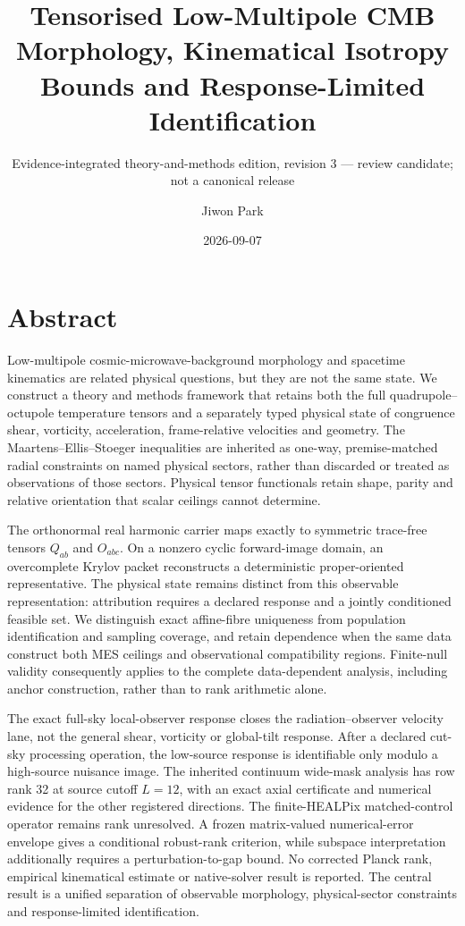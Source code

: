 \documentclass[
  11pt,
  a4paper]{article}
\title{Tensorised Low-Multipole CMB Morphology, Kinematical Isotropy Bounds and Response-Limited Identification}
\subtitle{Evidence-integrated theory-and-methods edition, revision 3 --- review candidate; not a canonical release}
\author{Jiwon Park}
\date{2026-09-07}
\begin{document}
\maketitle

\hypertarget{abstract}{%
\section*{Abstract}\label{abstract}}

Low-multipole cosmic-microwave-background morphology and spacetime kinematics are related physical questions, but they are not the same state. We construct a theory and methods framework that retains both the full quadrupole--octupole temperature tensors and a separately typed physical state of congruence shear, vorticity, acceleration, frame-relative velocities and geometry. The Maartens--Ellis--Stoeger inequalities are inherited as one-way, premise-matched radial constraints on named physical sectors, rather than discarded or treated as observations of those sectors. Physical tensor functionals retain shape, parity and relative orientation that scalar ceilings cannot determine.

The orthonormal real harmonic carrier maps exactly to symmetric trace-free tensors \(Q_{ab}\) and \(O_{abc}\). On a nonzero cyclic forward-image domain, an overcomplete Krylov packet reconstructs a deterministic proper-oriented representative. The physical state remains distinct from this observable representation: attribution requires a declared response and a jointly conditioned feasible set. We distinguish exact affine-fibre uniqueness from population identification and sampling coverage, and retain dependence when the same data construct both MES ceilings and observational compatibility regions. Finite-null validity consequently applies to the complete data-dependent analysis, including anchor construction, rather than to rank arithmetic alone.

The exact full-sky local-observer response closes the radiation--observer velocity lane, not the general shear, vorticity or global-tilt response. After a declared cut-sky processing operation, the low-source response is identifiable only modulo a high-source nuisance image. The inherited continuum wide-mask analysis has row rank 32 at source cutoff \(L=12\), with an exact axial certificate and numerical evidence for the other registered directions. The finite-HEALPix matched-control operator remains rank unresolved. A frozen matrix-valued numerical-error envelope gives a conditional robust-rank criterion, while subspace interpretation additionally requires a perturbation-to-gap bound. No corrected Planck rank, empirical kinematical estimate or native-solver result is reported. The central result is a unified separation of observable morphology, physical-sector constraints and response-limited identification.
\end{document}
